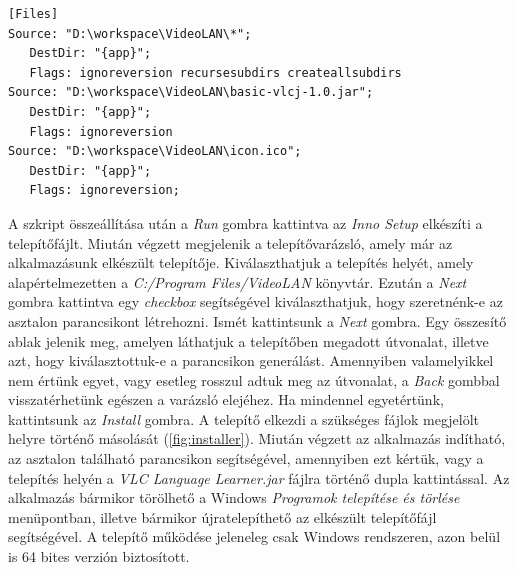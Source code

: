 \begin{spacing}{1.25}
\begin{lstlisting}[caption=Telepítőhöz szükséges fájlok, label={lst:files}]
[Files]
Source: "D:\workspace\VideoLAN\*";
   DestDir: "{app}";
   Flags: ignoreversion recursesubdirs createallsubdirs
Source: "D:\workspace\VideoLAN\basic-vlcj-1.0.jar";
   DestDir: "{app}";
   Flags: ignoreversion
Source: "D:\workspace\VideoLAN\icon.ico";
   DestDir: "{app}";
   Flags: ignoreversion;
\end{lstlisting}
\end{spacing}

A szkript összeállítása után a \textit{Run} gombra kattintva az \textit{Inno Setup} elkészíti a telepítőfájlt. Miután végzett megjelenik a telepítővarázsló, amely már az alkalmazásunk elkészült telepítője. Kiválaszthatjuk a telepítés helyét, amely alapértelmezetten a \textit{C:/Program Files/VideoLAN} könyvtár. Ezután a \textit{Next} gombra kattintva egy \textit{checkbox} segítségével kiválaszthatjuk, hogy szeretnénk-e az asztalon parancsikont létrehozni. Ismét kattintsunk a \textit{Next} gombra. Egy összesítő ablak jelenik meg, amelyen láthatjuk a telepítőben megadott útvonalat, illetve azt, hogy kiválasztottuk-e a parancsikon generálást. Amennyiben valamelyikkel nem értünk egyet, vagy esetleg rosszul adtuk meg az útvonalat, a \textit{Back} gombbal visszatérhetünk egészen a varázsló elejéhez. Ha mindennel egyetértünk, kattintsunk az \textit{Install} gombra. A telepítő elkezdi a szükséges fájlok megjelölt helyre történő másolását (\ref{fig:installer}). Miután végzett az alkalmazás indítható, az asztalon található parancsikon segítségével, amennyiben ezt kértük, vagy a telepítés helyén a \textit{VLC Language Learner.jar} fájlra történő dupla kattintással. Az alkalmazás bármikor törölhető a Windows \textit{Programok telepítése és törlése} menüpontban, illetve bármikor újratelepíthető az elkészült telepítőfájl segítségével. A telepítő működése jeleneleg csak Windows rendszeren, azon belül is 64 bites verzión biztosított.